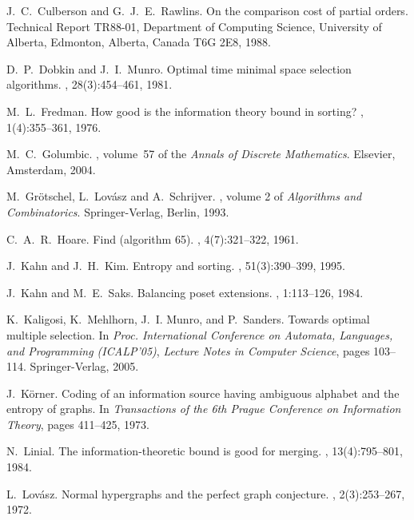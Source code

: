 \documentclass[12pt,oneside]{article}
\begin{document}
\begin{thebibliography}{10}
J.~C.~Culberson and G.~J.~E.~Rawlins.
\newblock On the comparison cost of partial orders.
\newblock Technical Report TR88-01, Department of Computing Science, University
  of Alberta, Edmonton, Alberta, Canada T6G 2E8, 1988.

D.~P.~Dobkin and J.~I.~Munro.
\newblock Optimal time minimal space selection algorithms.
, 28(3):454--461, 1981.

M.~L.~Fredman.
\newblock How good is the information theory bound in sorting?
, 1(4):355--361, 1976.

M.~C.~Golumbic.
, volume~57 of the {\em Annals of Discrete Mathematics}.
\newblock Elsevier, Amsterdam, 2004.

M.~Gr\"otschel, L.~Lov\'asz and A.~Schrijver.
, volume 2 of {\em Algorithms and Combinatorics}.
\newblock Springer-Verlag, Berlin, 1993.

C.~A.~R.~Hoare.
\newblock Find (algorithm 65).
, 4(7):321--322, 1961.

J.~Kahn and J.~H.~Kim.
\newblock Entropy and sorting.
, 51(3):390--399, 1995.

J.~Kahn and M.~E.~Saks.
\newblock Balancing poset extensions.
, 1:113--126, 1984.

K.~Kaligosi, K.~Mehlhorn, J.~I. Munro, and P.~Sanders.
\newblock Towards optimal multiple selection.
\newblock In {\em Proc. International Conference on Automata, Languages, and
  Programming ({ICALP'05})}, {\em Lecture Notes in Computer Science}, pages 103--114.
  Springer-Verlag, 2005.

J.~K\"orner.
\newblock Coding of an information source having ambiguous alphabet and the
  entropy of graphs.
\newblock In {\em Transactions of the 6th {P}rague {C}onference on
  {I}nformation {T}heory}, pages 411--425, 1973.

N.~Linial.
\newblock The information-theoretic bound is good for merging.
, 13(4):795--801, 1984.

L.~Lov{\'a}sz.
\newblock Normal hypergraphs and the perfect graph conjecture.
, 2(3):253--267, 1972.


\end{thebibliography}
\end{document}
